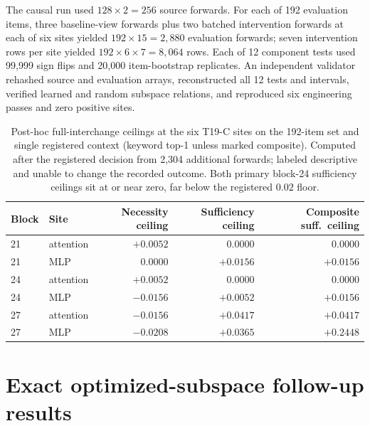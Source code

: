 \documentclass{article}
\begin{document}
The causal run used $128\times2=256$ source forwards. For each of 192
evaluation items, three baseline-view forwards plus two batched intervention
forwards at each of six sites yielded $192\times15=2{,}880$ evaluation
forwards; seven intervention rows per site yielded
$192\times6\times7=8{,}064$ rows. Each of 12 component tests used 99,999 sign flips and
20,000 item-bootstrap replicates. An independent validator rehashed source and
evaluation arrays, reconstructed all 12 tests and intervals, verified learned
and random subspace relations, and reproduced six engineering passes and zero
positive sites.

\begin{table}[H]
\centering
\scriptsize
\setlength{\tabcolsep}{4pt}
\begin{tabular}{llrrr}
\toprule
Block & Site & Necessity ceiling & Sufficiency ceiling & Composite suff.\ ceiling \\
\midrule
21 & attention & $+0.0052$ & $0.0000$ & $0.0000$ \\
21 & MLP       & $0.0000$  & $+0.0156$ & $+0.0156$ \\
24 & attention & $+0.0052$ & $0.0000$ & $0.0000$ \\
24 & MLP       & $-0.0156$ & $+0.0052$ & $+0.0156$ \\
27 & attention & $-0.0156$ & $+0.0417$ & $+0.0417$ \\
27 & MLP       & $-0.0208$ & $+0.0365$ & $+0.2448$ \\
\bottomrule
\end{tabular}
\caption{Post-hoc full-interchange ceilings at the six T19-C sites on the
192-item set and single registered context (keyword top-1 unless marked
composite). Computed after the registered decision from 2,304 additional
forwards; labeled descriptive and unable to change the recorded outcome. Both
primary block-24 sufficiency ceilings sit at or near zero, far below the
registered $0.02$ floor.}
\label{tab:posthoc}
\end{table}

\section{Exact optimized-subspace follow-up results}
\label{app:t20}
\end{document}
